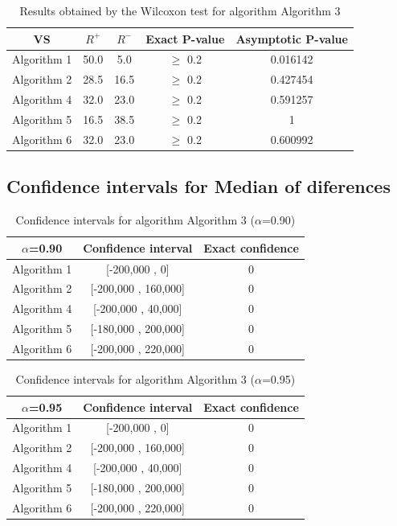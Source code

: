 \documentclass[a4paper,10pt]{article}
\begin{document}
\begin{table}[!htp]
\centering\small
\begin{tabular}{
|c|c|c|c|c|}
\hline
 VS & $R^{+}$ & $R^{-}$ & Exact P-value & Asymptotic P-value \\ \hline 
Algorithm 1 & 50.0 & 5.0 & $\geq$ 0.2 & 0.016142\\ \hline 
Algorithm 2 & 28.5 & 16.5 & $\geq$ 0.2 & 0.427454\\ \hline 
Algorithm 4 & 32.0 & 23.0 & $\geq$ 0.2 & 0.591257\\ \hline 
Algorithm 5 & 16.5 & 38.5 & $\geq$ 0.2 & 1\\ \hline 
Algorithm 6 & 32.0 & 23.0 & $\geq$ 0.2 & 0.600992\\ \hline 

\end{tabular}
\caption{Results obtained by the Wilcoxon test for algorithm Algorithm 3}
\end{table}

\subsection{Confidence intervals for Median of diferences}

\begin{table}[!htp]
\centering\small
\begin{tabular}{
|c|c|c|}
\hline
 $\alpha$=0.90 & Confidence interval & Exact confidence \\ \hline 
Algorithm 1 & [-200,000 , 0] & 0\\ \hline 
Algorithm 2 & [-200,000 , 160,000] & 0\\ \hline 
Algorithm 4 & [-200,000 , 40,000] & 0\\ \hline 
Algorithm 5 & [-180,000 , 200,000] & 0\\ \hline 
Algorithm 6 & [-200,000 , 220,000] & 0\\ \hline 

\end{tabular}
\caption{Confidence intervals for algorithm Algorithm 3 ($\alpha$=0.90)}
\end{table}
\begin{table}[!htp]
\centering\small
\begin{tabular}{
|c|c|c|}
\hline
 $\alpha$=0.95 & Confidence interval & Exact confidence \\ \hline 
Algorithm 1 & [-200,000 , 0] & 0\\ \hline 
Algorithm 2 & [-200,000 , 160,000] & 0\\ \hline 
Algorithm 4 & [-200,000 , 40,000] & 0\\ \hline 
Algorithm 5 & [-180,000 , 200,000] & 0\\ \hline 
Algorithm 6 & [-200,000 , 220,000] & 0\\ \hline 

\end{tabular}
\caption{Confidence intervals for algorithm Algorithm 3 ($\alpha$=0.95)}
\end{table}
\end{document}
